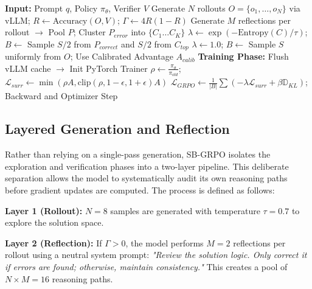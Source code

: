 \begin{algorithm}[ht]
\caption{SB-GRPO Training Step}
\label{alg:training_step}
\small
\begin{algorithmic}[1]
\STATE \textbf{Input:} Prompt $q$, Policy $\pi_\theta$, Verifier $V$
\STATE Generate $N$ rollouts $O = \{o_1, \dots, o_N\}$ via vLLM; $R \gets \text{Accuracy}(O, V)$; $\Gamma \gets 4R(1-R)$
    \STATE Generate $M$ reflections per rollout $\to$ Pool $P$; Cluster $P_{error}$ into $\{C_1 \dots C_K\}$
    \STATE $\lambda \gets \exp(-\text{Entropy}(C)/\tau)$; $B \gets$ Sample $S/2$ from $P_{correct}$ and $S/2$ from $C_{top}$
\ELSE
    \STATE $\lambda \gets 1.0$; $B \gets$ Sample $S$ uniformly from $O$; Use Calibrated Advantage $A_{calib}$
\ENDIF
\STATE \textbf{Training Phase:} Flush vLLM cache $\to$ Init PyTorch Trainer
\STATE $\rho \gets \frac{\pi_\theta}{\pi_{old}}$; $\mathcal{L}_{surr} \gets \min\left(\rho A, \text{clip}\left(\rho, 1-\epsilon, 1+\epsilon\right)A\right)$
\STATE $\mathcal{L}_{GRPO} \gets \frac{1}{|B|} \sum \left( -\lambda \mathcal{L}_{surr} + \beta \mathbb{D}_{KL} \right)$; Backward and Optimizer Step
\end{algorithmic}
\end{algorithm}

\subsection{Layered Generation and Reflection}\label{subsec:layer-generation-reflection}
Rather than relying on a single-pass generation, SB-GRPO isolates the exploration and verification phases into a two-layer pipeline. This deliberate separation allows the model to systematically audit its own reasoning paths before gradient updates are computed. The process is defined as follows:

\textbf{Layer 1 (Rollout):} $N=8$ samples are generated with temperature $\tau=0.7$ to explore the solution space.

\textbf{Layer 2 (Reflection):} If $\Gamma > 0$, the model performs $M=2$ reflections per rollout using a neutral system prompt: \textit{"Review the solution logic. Only correct it if errors are found; otherwise, maintain consistency."} This creates a pool of $N \times M = 16$ reasoning paths.


